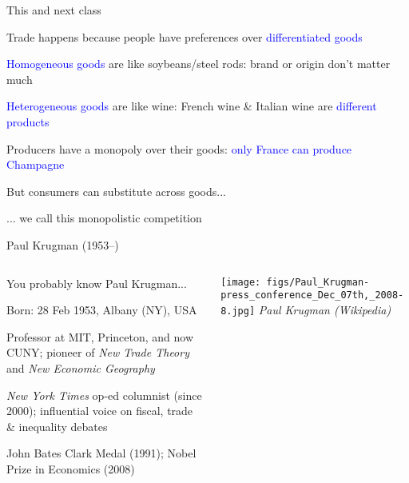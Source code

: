 \documentclass[notes,11pt, aspectratio=169, xcolor=table]{beamer}
\newcommand{\blue}[1]{\textcolor{blue}{#1}}
\newenvironment{wideitemize}{\itemize\addtolength{\itemsep}{10pt}}{\enditemize}
\begin{document}
\begin{frame}{This and next class}
\begin{wideitemize}
    \item Trade happens because people have preferences over \blue{differentiated goods}
    \item<2-> \blue{Homogeneous goods} are like soybeans/steel rods: brand or origin don't matter much
    \item<3-> \blue{Heterogeneous goods} are like wine: French wine \& Italian wine are \blue{different products}
    \item<4-> Producers have a monopoly over their goods: \blue{only France can produce Champagne}
    \item<5-> But consumers can substitute across goods...
    \item<6-> ... we call this monopolistic competition 
    \end{wideitemize}
\end{frame}


\begin{frame}{Paul Krugman (1953–)}
\begin{columns}
    \begin{column}{0.65\textwidth}
        \begin{wideitemize}
            \item You probably know Paul Krugman...
            \item Born: 28 Feb 1953, Albany (NY), USA
            \item Professor at MIT, Princeton, and now CUNY; pioneer of \textit{New Trade Theory} and \textit{New Economic Geography}
            \item \textit{New York Times} op-ed columnist (since 2000); influential voice on fiscal, trade \& inequality debates
            \item John Bates Clark Medal (1991); Nobel Prize in Economics (2008)
        \end{wideitemize}

    \end{column}
    
    \begin{column}{0.35\textwidth}
        \centering
        \texttt{[image: figs/Paul\_Krugman-press\_conference\_Dec\_07th,\_2008-8.jpg]} %
        \vspace{0.2cm}
        \scriptsize\textit{Paul Krugman (Wikipedia)}
    \end{column}
\end{columns}
\end{frame}
\end{document}
